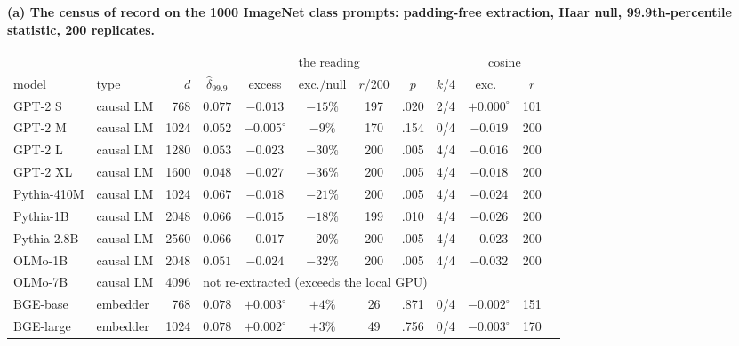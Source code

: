 \begin{table}[H]
\centering
\scriptsize
\setlength{\tabcolsep}{2.5pt}
\begingroup
\noindent\textbf{(a) The census of record on the 1000 ImageNet class prompts: padding-free extraction, Haar null, 99.9th-percentile statistic, 200 replicates.}\par\vspace{1.5pt}
\setlength{\tabcolsep}{3.5pt}
\begin{tabular}{llrccccccc|cc}
\toprule
 & & & \multicolumn{6}{c|}{the reading} & \multicolumn{2}{c}{cosine} \\
model & type & $d$ & $\hat\delta_{99.9}$ & excess & exc./null & $r$/200 & $p$ & $k$/4 & exc.\ & $r$ \\
\midrule
GPT-2 S & causal LM & 768 & $0.077$ & $-0.013$ & $-15\%$ & 197 & .020 & 2/4 & $+0.000^{\circ}$ & 101 \\
GPT-2 M & causal LM & 1024 & $0.052$ & $-0.005^{\circ}$ & $-9\%$ & 170 & .154 & 0/4 & $-0.019$ & 200 \\
GPT-2 L & causal LM & 1280 & $0.053$ & $-0.023$ & $-30\%$ & 200 & .005 & 4/4 & $-0.016$ & 200 \\
GPT-2 XL & causal LM & 1600 & $0.048$ & $-0.027$ & $-36\%$ & 200 & .005 & 4/4 & $-0.018$ & 200 \\
\midrule
Pythia-410M & causal LM & 1024 & $0.067$ & $-0.018$ & $-21\%$ & 200 & .005 & 4/4 & $-0.024$ & 200 \\
Pythia-1B & causal LM & 2048 & $0.066$ & $-0.015$ & $-18\%$ & 199 & .010 & 4/4 & $-0.026$ & 200 \\
Pythia-2.8B & causal LM & 2560 & $0.066$ & $-0.017$ & $-20\%$ & 200 & .005 & 4/4 & $-0.023$ & 200 \\
OLMo-1B & causal LM & 2048 & $0.051$ & $-0.024$ & $-32\%$ & 200 & .005 & 4/4 & $-0.032$ & 200 \\
OLMo-7B & causal LM & 4096 & \multicolumn{8}{l}{not re-extracted (exceeds the local GPU)} \\
\midrule
BGE-base & embedder & 768 & $0.078$ & $+0.003^{\circ}$ & $+4\%$ & 26 & .871 & 0/4 & $-0.002^{\circ}$ & 151 \\
BGE-large & embedder & 1024 & $0.078$ & $+0.002^{\circ}$ & $+3\%$ & 49 & .756 & 0/4 & $-0.003^{\circ}$ & 170 \\

\end{tabular}
\end{table}
